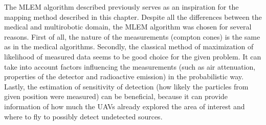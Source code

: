 {    The \ac{MLEM} algorithm described previously serves as an inspiration for the mapping method described in this chapter.
    Despite all the differences between the medical and multirobotic domain, the \ac{MLEM} algorithm was chosen for several reasons.
    First of all, the nature of the measurements (compton cones) is the same as in the medical algorithms.
    Secondly, the classical method of maximization of likelihood of measured data seems to be good choice for the given problem.
    It can take into account factors influencing the measurements (such as air attenuation, properties of the detector and radioactive emission) in the probabilistic way.
    Lastly, the estimation of sensitivity of detection (how likely the particles from given position were measured) can be beneficial, 
    because it can provide information of how much the \ac{UAV}s already explored the area of interest and where to fly to possibly detect undetected sources.
}%

